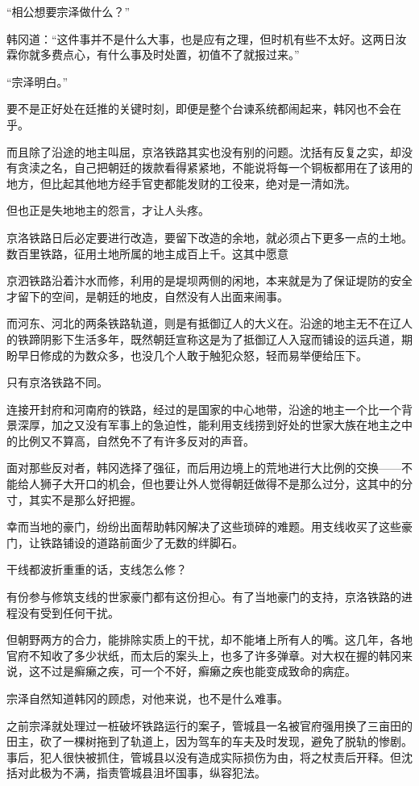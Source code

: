“相公想要宗泽做什么？”

韩冈道：“这件事并不是什么大事，也是应有之理，但时机有些不太好。这两日汝霖你就多费点心，有什么事及时处置，初值不了就报过来。”

“宗泽明白。”

要不是正好处在廷推的关键时刻，即便是整个台谏系统都闹起来，韩冈也不会在乎。

而且除了沿途的地主叫屈，京洛铁路其实也没有别的问题。沈括有反复之实，却没有贪渎之名，自己把朝廷的拨款看得紧紧地，不能说将每一个铜板都用在了该用的地方，但比起其他地方经手官吏都能发财的工役来，绝对是一清如洗。

但也正是失地地主的怨言，才让人头疼。

京洛铁路日后必定要进行改造，要留下改造的余地，就必须占下更多一点的土地。数百里铁路，征用土地所属的地主成百上千。这其中愿意

京泗铁路沿着汴水而修，利用的是堤坝两侧的闲地，本来就是为了保证堤防的安全才留下的空间，是朝廷的地皮，自然没有人出面来闹事。

而河东、河北的两条铁路轨道，则是有抵御辽人的大义在。沿途的地主无不在辽人的铁蹄阴影下生活多年，既然朝廷宣称这是为了抵御辽人入寇而铺设的运兵道，期盼早日修成的为数众多，也没几个人敢于触犯众怒，轻而易举便给压下。

只有京洛铁路不同。

连接开封府和河南府的铁路，经过的是国家的中心地带，沿途的地主一个比一个背景深厚，加之又没有军事上的急迫性，能利用支线捞到好处的世家大族在地主之中的比例又不算高，自然免不了有许多反对的声音。

面对那些反对者，韩冈选择了强征，而后用边境上的荒地进行大比例的交换——不能给人狮子大开口的机会，但也要让外人觉得朝廷做得不是那么过分，这其中的分寸，其实不是那么好把握。

幸而当地的豪门，纷纷出面帮助韩冈解决了这些琐碎的难题。用支线收买了这些豪门，让铁路铺设的道路前面少了无数的绊脚石。

干线都波折重重的话，支线怎么修？

有份参与修筑支线的世家豪门都有这份担心。有了当地豪门的支持，京洛铁路的进程没有受到任何干扰。

但朝野两方的合力，能排除实质上的干扰，却不能堵上所有人的嘴。这几年，各地官府不知收了多少状纸，而太后的案头上，也多了许多弹章。对大权在握的韩冈来说，这不过是癣癞之疾，可一个不好，癣癞之疾也能变成致命的病症。

宗泽自然知道韩冈的顾虑，对他来说，也不是什么难事。

之前宗泽就处理过一桩破坏铁路运行的案子，管城县一名被官府强用换了三亩田的田主，砍了一棵树拖到了轨道上，因为驾车的车夫及时发现，避免了脱轨的惨剧。事后，犯人很快被抓住，管城县以没有造成实际损伤为由，将之杖责后开释。但沈括对此极为不满，指责管城县沮坏国事，纵容犯法。

